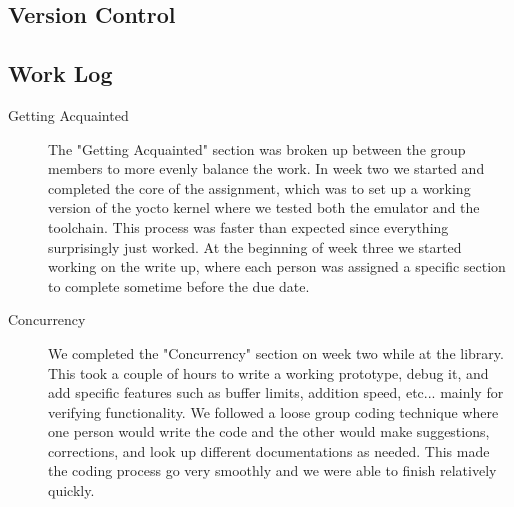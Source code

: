\documentclass[letterpaper,10pt]{article}
\begin{document}
\subsection{Version Control}

\subsection{Work Log}
\begin{description}
    \item[Getting Acquainted]
    The "Getting Acquainted" section was broken up between the group members to more evenly balance the work. In week two we started and completed the core of the assignment, which was to set up a working version of the yocto kernel where we tested both the emulator and the toolchain. This process was faster than expected since everything surprisingly just worked. At the beginning of week three we started working on the write up, where each person was assigned a specific section to complete sometime before the due date.
    \item[Concurrency]
    We completed the "Concurrency" section on week two while at the library. This took a couple of hours to write a working prototype, debug it, and add specific features such as buffer limits, addition speed, etc... mainly for verifying functionality. We followed a loose group coding technique where one person would write the code and the other would make suggestions, corrections, and look up different documentations as needed. This made the coding process go very smoothly and we were able to finish relatively quickly.
                \end{description}
\end{document}
